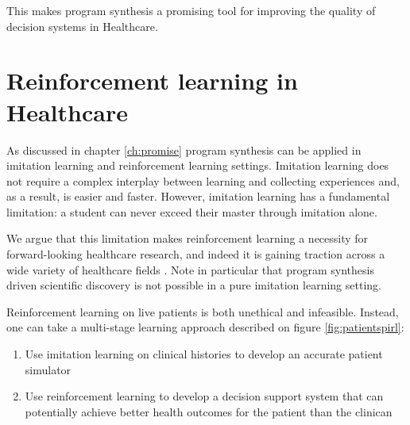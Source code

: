 This makes program synthesis a promising tool for improving the quality of decision systems in Healthcare.

\section{Reinforcement learning in Healthcare}
\label{sec:rl-health}

As discussed in chapter \ref{ch:promise} program synthesis can be applied in imitation learning and reinforcement learning settings.
Imitation learning does not require a complex interplay between learning and collecting experiences and, as a result, is easier and faster.
However, imitation learning has a fundamental limitation: a student can never exceed their master through imitation alone.

We argue that this limitation makes reinforcement learning a necessity for forward-looking healthcare research, and indeed it is gaining traction across a wide variety of healthcare fields \cite{yuReinforcementLearningHealthcare2021}.
Note in particular that program synthesis driven scientific discovery is not possible in a pure imitation learning setting.

Reinforcement learning on live patients is both unethical and infeasible.
Instead, one can take a multi-stage learning approach described on figure \ref{fig:patientspirl}: 
\begin{enumerate}
  \item Use imitation learning on clinical histories to develop an accurate patient simulator
  \item Use reinforcement learning to develop a decision support system that can potentially achieve better health outcomes for the patient than the clinican
\end{enumerate}

